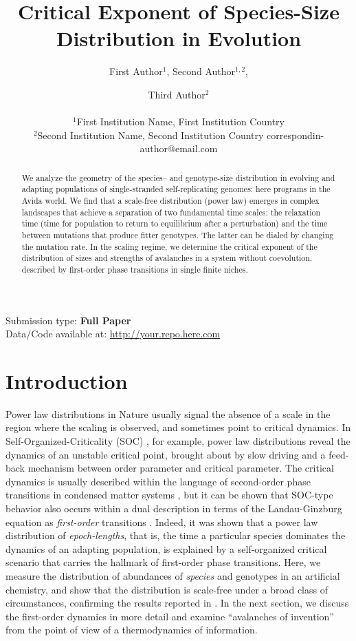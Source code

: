 \documentclass[letterpaper]{article}
\title{Critical Exponent of Species-Size Distribution in Evolution}
\author{
    First Author$^{1}$,
    Second Author$^{1,2}$, \and
    Third Author$^2$ \\
    \mbox{}\\
    $^1$First Institution Name, First Institution Country \\
    $^2$Second Institution Name, Second Institution Country
    correspondin-author@email.com
} %
\begin{document}
\maketitle

\begin{abstract}
    We analyze the geometry of the species-- and genotype-size distribution in evolving and adapting populations of single-stranded self-replicating genomes: here programs in the Avida world.
    We find that a scale-free distribution (power law) emerges in complex landscapes that achieve a separation of two fundamental time scales: the relaxation time (time for population to return to equilibrium after a perturbation) and the time between mutations that produce fitter genotypes.
    The latter can be dialed by changing the mutation rate.
    In the scaling regime, we determine the critical exponent of the distribution of sizes and strengths of avalanches in a system without coevolution, described by first-order phase transitions in single finite niches.
\end{abstract}


Submission type: \textbf{Full Paper}\\

Data/Code available at: \url{http://your.repo.here.com}

\section{Introduction}
Power law distributions in Nature usually signal the absence of a
scale in the region where the scaling is observed, and sometimes point
to critical dynamics. In Self-Organized-Criticality (SOC)
\citep{BTW87,BTW88}, for example, power law distributions reveal the
dynamics of an unstable critical point, brought about by slow driving
and a feed-back mechanism between order parameter and critical
parameter.  The critical dynamics is usually described within the
language of second-order phase transitions in condensed matter systems
\citep{SJD}, but it can be shown that SOC-type behavior also occurs
within a dual description in terms of the Landau-Ginzburg equation as
{\em first-order} transitions \citep{GS}.  Indeed, it was shown that a
power law distribution of {\em epoch-lengths}, that is, the time a
particular species dominates the dynamics of an adapting population,
is explained by a self-organized critical scenario \citep{CA2} that
carries the hallmark of first-order phase transitions. Here, we
measure the distribution of abundances of {\em species} and genotypes
in an artificial chemistry, \citep[the Avida Artificial Life
system][]{AB1,OBA} and show that the distribution is scale-free under
a broad class of circumstances, confirming the results reported in
\citep{CA2}.  In the next section, we discuss the first-order dynamics
in more detail and examine ``avalanches of invention'' from the point
of view of a thermodynamics of information.
\end{document}
